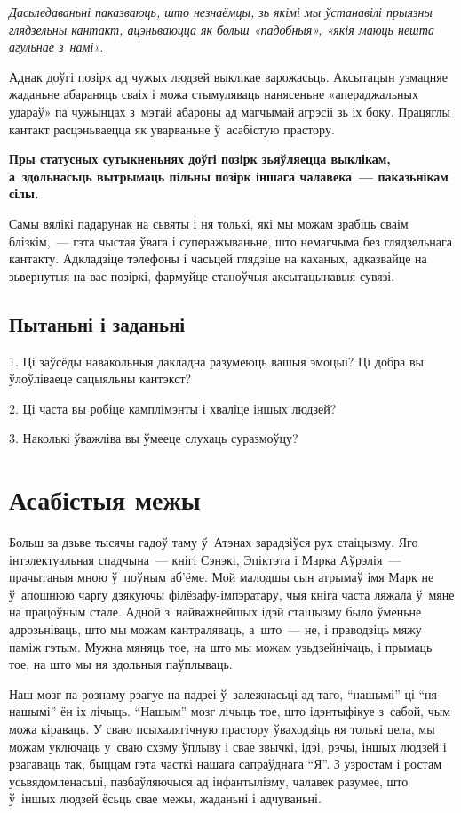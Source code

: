 \emph{Дасьледаваньні паказваюць, што незнаёмцы, зь якімі мы ўстанавілі прыязны глядзельны кантакт, ацэньваюцца як больш «падобныя», «якія маюць нешта агульнае з~намі».}

Аднак доўгі позірк ад чужых людзей выклікае варожасьць. Аксытацын узмацняе жаданьне абараняць сваіх і можа стымуляваць нанясеньне «апераджальных удараў» па чужынцах з~мэтай абароны ад магчымай агрэсіі зь іх боку. Працяглы кантакт расцэньваецца як уварваньне ў~асабістую прастору. 

\textbf{Пры статусных сутыкненьнях доўгі позірк зьяўляецца выклікам, а~здольнасьць вытрымаць пільны позірк іншага чалавека~--- паказьнікам сілы.} 

Самы вялікі падарунак на сьвяты і ня толькі, які мы можам зрабіць сваім блізкім,~--- гэта чыстая ўвага і суперажываньне, што немагчыма без глядзельнага кантакту. Адкладзіце тэлефоны і часьцей глядзіце на каханых, адказвайце на зьвернутыя на вас позіркі, фармуйце станоўчыя аксытацынавыя сувязі.

\subsection*{Пытаньні і заданьні}

1. Ці заўсёды навакольныя дакладна разумеюць вашыя эмоцыі? Ці добра вы ўлоўліваеце сацыяльны кантэкст?

2. Ці часта вы робіце камплімэнты і хваліце іншых людзей?

3. Наколькі ўважліва вы ўмееце слухаць суразмоўцу?


\section{Асабістыя межы}

Больш за дзьве тысячы гадоў таму ў~Атэнах зарадзіўся рух стаіцызму. Яго інтэлектуальная спадчына~--- кнігі Сэнэкі, Эпіктэта і Марка Аўрэлія~--- прачытаныя мною ў~поўным аб'ёме. Мой малодшы сын атрымаў імя Марк не ў~апошнюю чаргу дзякуючы філёзафу-імпэратару, чыя кніга часта ляжала ў~мяне на працоўным стале. Адной з~найважнейшых ідэй стаіцызму было ўменьне адрозьніваць, што мы можам кантраляваць, а~што~--- не, і праводзіць мяжу паміж гэтым. Мужна мяняць тое, на што мы можам узьдзейнічаць, і прымаць тое, на што мы ня здольныя паўплываць.

Наш мозг па-рознаму рэагуе на падзеі ў~залежнасьці ад таго, ``нашымі'' ці ``ня нашымі'' ён іх лічыць. ``Нашым'' мозг лічыць тое, што ідэнтыфікуе з~сабой, чым можа кіраваць. У сваю псыхалягічную прастору ўваходзіць ня толькі цела, мы можам уключаць у~сваю схэму ўплыву і свае звычкі, ідэі, рэчы, іншых людзей і рэагаваць так, быццам гэта часткі нашага сапраўднага ``Я''. З узростам і ростам усьвядомленасьці, пазбаўляючыся ад інфантылізму, чалавек разумее, што ў~іншых людзей ёсьць свае межы, жаданьні і адчуваньні. 

